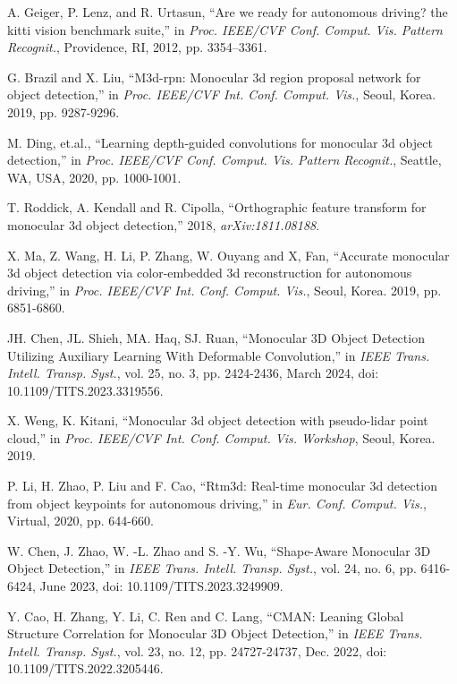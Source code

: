 \documentclass[journal]{IEEEtran}
\begin{document}
\begin{thebibliography}{1}
		A. Geiger, P. Lenz, and R. Urtasun, “Are we ready for autonomous driving? the kitti vision benchmark suite,” in \textit{Proc. IEEE/CVF Conf. Comput. Vis. Pattern Recognit.}, Providence, RI, 2012, pp. 3354–3361.
		
		G. Brazil and X. Liu, “M3d-rpn: Monocular 3d region proposal network for object detection,” in \textit{Proc. IEEE/CVF Int. Conf. Comput. Vis.}, Seoul, Korea. 2019, pp. 9287-9296.
		
		M. Ding, et.al., “Learning depth-guided convolutions for monocular 3d object detection,” in \textit{Proc. IEEE/CVF Conf. Comput. Vis. Pattern Recognit.}, Seattle, WA, USA, 2020, pp. 1000-1001.
		
		T. Roddick, A. Kendall and R. Cipolla, “Orthographic feature transform for monocular 3d object detection,” 2018, \textit{arXiv:1811.08188}.
		
		X. Ma, Z. Wang, H. Li, P. Zhang, W. Ouyang and X, Fan, “Accurate monocular 3d object detection via color-embedded 3d reconstruction for autonomous driving,” in \textit{Proc. IEEE/CVF Int. Conf. Comput. Vis.}, Seoul, Korea. 2019, pp. 6851-6860.
		
		JH. Chen, JL. Shieh, MA. Haq, SJ. Ruan, “Monocular 3D Object Detection Utilizing Auxiliary Learning With Deformable Convolution,” in \textit{IEEE Trans. Intell. Transp. Syst.}, vol. 25, no. 3, pp. 2424-2436, March 2024, doi: 10.1109/TITS.2023.3319556.
		
		X. Weng, K. Kitani, “Monocular 3d object detection with pseudo-lidar point cloud,” in \textit{Proc. IEEE/CVF Int. Conf. Comput. Vis. Workshop}, Seoul, Korea. 2019.
		
		P. Li, H. Zhao, P. Liu and F. Cao, “Rtm3d: Real-time monocular 3d detection from object keypoints for autonomous driving,” in \textit{Eur. Conf. Comput. Vis.}, Virtual, 2020, pp. 644-660.
		
		W. Chen, J. Zhao, W. -L. Zhao and S. -Y. Wu, “Shape-Aware Monocular 3D Object Detection,” in \textit{IEEE Trans. Intell. Transp. Syst.}, vol. 24, no. 6, pp. 6416-6424, June 2023, doi: 10.1109/TITS.2023.3249909.
		
		

		
		Y. Cao, H. Zhang, Y. Li, C. Ren and C. Lang, “CMAN: Leaning Global Structure Correlation for Monocular 3D Object Detection,” in \textit{IEEE Trans. Intell. Transp. Syst.}, vol. 23, no. 12, pp. 24727-24737, Dec. 2022, doi: 10.1109/TITS.2022.3205446.
		


\end{thebibliography}
\end{document}
